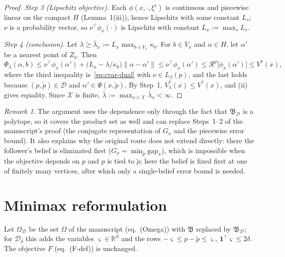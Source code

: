 \documentclass[11pt]{article}
\theoremstyle{definition}
\theoremstyle{remark}
\newtheorem{remark}{Remark}
\newcommand{\X}{\mathcal{X}}
\newcommand{\D}{\mathcal{D}}
\newcommand{\tp}{\tilde{p}}
\newcommand{\B}{\mathfrak{B}}
\newcommand{\R}{\mathcal{R}}
\newcommand{\gap}{\mathrm{gap}}
\begin{document}
\begin{proof}
\emph{Step 3 (Lipschitz objective).} Each $\phi(x,\cdot,\xi^s)$ is continuous and piecewise linear on the compact $H$ (Lemma~1(iii)), hence Lipschitz with some constant $L_s$; $\nu$ is a probability vector, so $\nu^\top\phi_x(\cdot)$ is Lipschitz with constant $L_x:=\max_sL_s$.

\emph{Step 4 (conclusion).} Let $\lambda\ge\bar\lambda_x:=L_x\max_{b\in V_x}\kappa_b$. For $b\in V_x$ and $\alpha\in H$, let $\alpha'$ be a nearest point of $Z_b$. Then
\[
  \Phi_\lambda(\alpha,b)\le\nu^\top\phi_x(\alpha')+\big(L_x-\lambda/\kappa_b\big)\|\alpha-\alpha'\|\le\nu^\top\phi_x(\alpha')\le\R^p\big[\phi_x(\alpha')\big]\le V^*(x),
\]
where the third inequality is~\eqref{eq:cvar-dual} with $\nu\in L_\beta(p)$, and the last holds because $(p,\tp)\in\D$ and $\alpha'\in\Psi(x,\tp)$. By Step~1, $V^*_\lambda(x)\le V^*(x)$, and (ii) gives equality. Since $\X$ is finite, $\bar\lambda:=\max_{x\in\X}\bar\lambda_x<\infty$.
\end{proof}

\begin{remark}
The argument uses the dependence only through the fact that $\B_\D$ is a polytope, so it covers the product set as well and can replace Steps~1--2 of the manuscript's proof (the conjugate representation of $G_x$ and the piecewise error bound). It also explains why the original route does not extend directly: there the follower's belief is eliminated first ($G_x=\min_{\tp}\gap_x$), which is impossible when the objective depends on $p$ and $p$ is tied to $\tp$; here the belief is fixed first at one of finitely many vertices, after which only a single-belief error bound is needed.
\end{remark}

\section{Minimax reformulation}

Let $\Omega_\D$ be the set $\Omega$ of the manuscript (eq.~(Omega)) with $\B$ replaced by $\B_\D$; for $\D_\delta$ this adds the variables $\varsigma\in\mathbb R^S$ and the rows $-\varsigma\le p-\tp\le\varsigma$, $\mathbf 1^\top\varsigma\le2\delta$. The objective $F$ (eq.~(F-def)) is unchanged.
\end{document}
